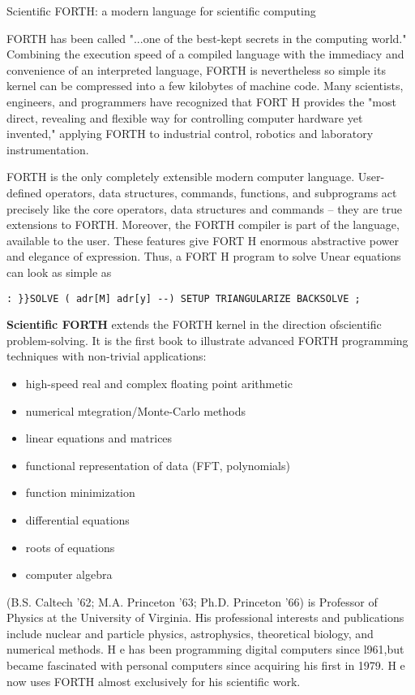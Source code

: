 Scientific FORTH: a modern language for scientific computing

FORTH has been called "...one of the best-kept secrets in the computing world." Combining the execution speed of a compiled language with the immediacy and convenience of an interpreted language, FORTH is nevertheless so simple its kernel can be compressed into a few kilobytes of machine code. Many scientists, engineers, and programmers have recognized that FORT H provides the "most direct, revealing and flexible way for controlling computer hardware yet invented," applying FORTH to industrial control, robotics and laboratory instrumentation.

FORTH is the only completely extensible modern computer language. User-defined operators, data structures, commands, functions, and subprograms act precisely like the core operators, data structures and commands -- they are true extensions to FORTH. Moreover, the FORTH compiler is part of the language, available to the user. These features give FORT H enormous abstractive power and elegance of expression. Thus, a FORT H program to solve Unear equations can look as simple as

\begin{lstlisting}
: }}SOLVE ( adr[M] adr[y] --) SETUP TRIANGULARIZE BACKSOLVE ; 
\end{lstlisting}

\textbf{Scientific FORTH} extends the FORTH kernel in the direction ofscientific problem-solving. It is the first book to illustrate advanced FORTH programming techniques with non-trivial applications:

\begin{itemize}
    \item high-speed real and complex floating point arithmetic
    \item numerical mtegration/Monte-Carlo methods
    \item linear equations and matrices
    \item functional representation of data (FFT, polynomials)
    \item function minimization
    \item differential equations
    \item roots of equations
    \item computer algebra
\end{itemize}

 (B.S. Caltech '62; M.A. Princeton '63; Ph.D. Princeton '66) is Professor of Physics at the University of Virginia. His professional interests and publications include nuclear and particle physics, astrophysics, theoretical biology, and numerical methods. H e has been programming digital computers since l961,but became fascinated with personal computers since acquiring his first in 1979. H e now uses FORTH almost exclusively for his scientific work. 